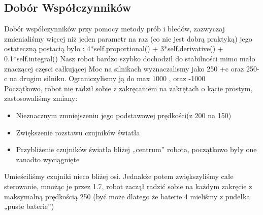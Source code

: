 \documentclass[paper=a4, fontsize=11pt]{scrartcl} %
\numberwithin{equation}{section} %
\numberwithin{figure}{section} %
\numberwithin{table}{section} %
\begin{document}
\subsection{Dobór Współczynników }
Dobór współczynników przy pomocy metody prób i błedów, zazwyczaj zmienialiśmy więcej niż jeden parametr na raz (co nie jest dobrą praktyką)  jego ostateczną postacią było :  
4*self.proportional() + 3*self.derivative() + 0.1*self.integral()  
Nasz robot bardzo szybko dochodził do stabilności mimo mało znaczącej częsci całkującej  
Moc na silnikach wyznaczalismy jako 250 +c oraz 250-c na drugim silniku. Ograniczylismy ją do max 1000 , oraz -1000\\
Początkowo, robot nie radził sobie z zakręcaniem na zakrętach o kącie prostym, zastosowaliśmy zmiany: 
\begin{itemize}  
\item Nieznacznym zmniejszeniu jego podstawowej prędkości(z 200 na 150)
\item Zwiększenie rozstawu czujników światła   
\item Przybliżenie czujników światła bliżej „centrum” robota, początkowo były one zanadto wyciągnięte  
\end{itemize}
 Umieściliśmy czujniki  nieco bliżej osi. 
Jednakże potem zwiększyliśmy całe sterowanie, mnożąc je przez 1.7, robot zaczął radzić sobie na każdym zakręcie z maksymalną prędkością 250 (być może dlatego że baterie 4 mieliśmy z pudełka „puste baterie”) 
\end{document}
